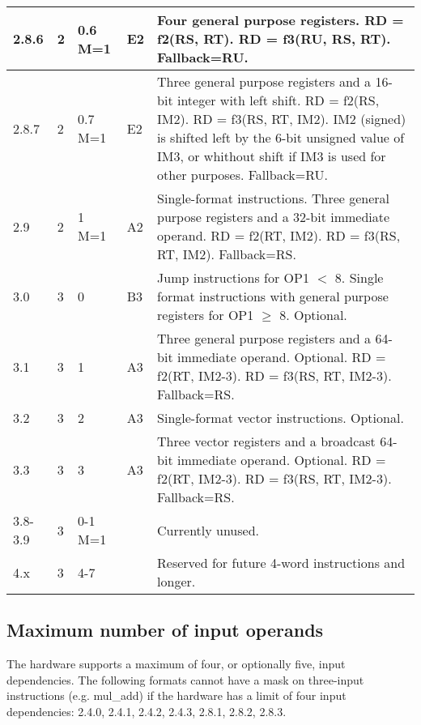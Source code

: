 \documentclass[forwardcom.tex]{subfiles}
\begin{document}
\begin{longtable} {|p{10mm}|p{6mm}|p{9mm}|p{7mm}|p{80mm}|}
\hline
2.8.6 & 2 & 0.6 M=1 & E2 & Four general purpose registers.\newline 
RD = f2(RS, RT). RD = f3(RU, RS, RT). Fallback=RU.\\

\hline
2.8.7 & 2 & 0.7 M=1 & E2 & Three general purpose registers and a 16-bit integer with left shift.\newline 
RD = f2(RS, IM2). RD = f3(RS, RT, IM2). 
IM2 (signed) is shifted left by the 6-bit unsigned value of IM3, or whithout shift if IM3 is used for other purposes. Fallback=RU. \\

\hline
2.9 & 2 & 1 M=1 & A2 & Single-format instructions. Three general purpose registers and a 32-bit immediate operand.\newline 
RD = f2(RT, IM2). RD = f3(RS, RT, IM2). Fallback=RS.\\

\hline
3.0 & 3 & 0 & B3 & Jump instructions for OP1 $<$ 8. Single format instructions with general purpose registers for OP1 $\geq$ 8. Optional.\\

\hline
3.1 & 3 & 1 & A3 & Three general purpose registers and a 64-bit immediate operand. Optional.\newline 
RD = f2(RT, IM2-3). RD = f3(RS, RT, IM2-3). Fallback=RS.\\

\hline
3.2 & 3 & 2 & A3 & Single-format vector instructions. Optional. \\

\hline
3.3 & 3 & 3 & A3 & Three vector registers and a broadcast 64-bit immediate operand. Optional.\newline 
RD = f2(RT, IM2-3). RD = f3(RS, RT, IM2-3). Fallback=RS.\\

\hline
3.8-3.9 & 3 & 0-1 M=1 & & Currently unused. \\
\hline
4.x & 3 & 4-7 &  & Reserved for future 4-word instructions and longer. \\
\hline
\end{longtable}

\vspace{2mm}
\subsection{Maximum number of input operands}
The hardware supports a maximum of four, or optionally five, input dependencies. The following formats cannot have a mask on three-input instructions (e.g. mul\_add) if the hardware has a limit of four input dependencies: 2.4.0, 2.4.1, 2.4.2, 2.4.3, 2.8.1, 2.8.2, 2.8.3.
\end{document}
